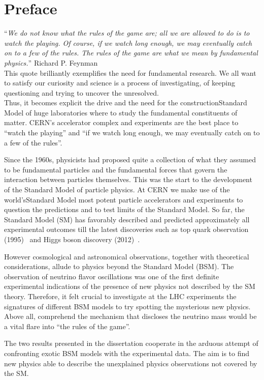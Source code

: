 \chapter*{Preface}\label{chapter:introduction}
\enquote{\itshape {\small We do not know what the rules of the game are; all we are allowed to
do is to watch the playing. Of course, if we watch long enough, we may
eventually catch on to a few of the rules. The rules of the game are
what we mean by fundamental physics.}} Richard P. Feynman\\
This quote brilliantly exemplifies the need for fundamental
research. We all want to satisfy our 
curiosity and science is a process of investigating, of keeping
questioning and trying to uncover the unresolved.\\
Thus, it becomes explicit the drive and the need for the constructionStandard Model
of huge laboratories where to study the fundamental constituents of
matter.
CERN's accelerator complex and experiments are the
best place to ``watch the playing'' and ``if we watch long enough, we may
eventually catch on to a few of the rules''.

Since the 1960s, physicists had proposed quite a collection of what
they assumed to be fundamental particles and the fundamental forces
 that govern the interaction between particles themselves. This was
 the start to the development of the Standard Model of particle
 physics. At CERN we make use of the world'sStandard Model
most potent particle accelerators and experiments to question the
predictions and to test limits of the Standard Model. So far,
the Standard Model (SM) has favorably described and predicted
approximately all experimental outcomes till the latest
discoveries such as top quark observation (1995)~\cite{Abachi_1995}
and Higgs boson discovery (2012)~\cite{20121,201230}.

However cosmological and astronomical observations, together with theoretical
considerations, allude to physics beyond the Standard Model (BSM).
The observation of neutrino flavor oscillations was one of the first 
definite experimental indications of the
presence of new physics not described by the SM theory.
 Therefore, it felt crucial to investigate at the LHC
experiments the signatures of different BSM models
to try spotting the mysterious new physics. Above all, comprehend the
mechanism that discloses the neutrino mass would be a
vital flare into ``the rules of the game''.

The two results presented in the dissertation cooperate in the arduous attempt of confronting exotic BSM
models with the experimental data. The aim is to find new
physics able to describe the unexplained
physics observations not covered by the SM.\\


